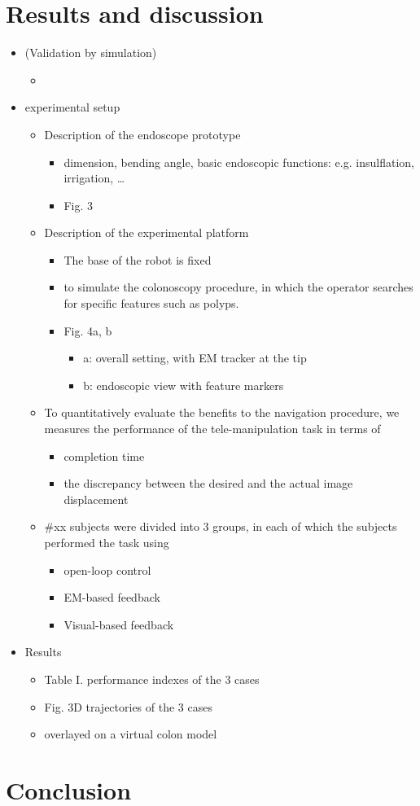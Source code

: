 \documentclass[journal,onecolumn]{IEEEtran}
\begin{document}
\section{Results and discussion}
\label{sec:org17c1b76}
\begin{itemize}
\item (Validation by simulation)
\begin{itemize}
\item 
\end{itemize}
\item experimental setup
\begin{itemize}
\item Description of the endoscope prototype
\begin{itemize}
\item dimension, bending angle, basic endoscopic functions: e.g. insulflation, irrigation, \ldots{}
\item Fig. 3
\end{itemize}
\item Description of the experimental platform
\begin{itemize}
\item The base of the robot is fixed
\item to simulate the colonoscopy procedure, in which the operator searches for specific features such as polyps.
\item Fig. 4a, b
\begin{itemize}
\item a: overall setting, with EM tracker at the tip
\item b: endoscopic view with feature markers
\end{itemize}
\end{itemize}
\item To quantitatively evaluate the benefits to the navigation procedure, we measures the performance of the tele-manipulation task in terms of
\begin{itemize}
\item completion time
\item the discrepancy between the desired and the actual image displacement
\end{itemize}
\item \#xx subjects were divided into 3 groups, in each of which the subjects performed the task using
\begin{itemize}
\item open-loop control
\item EM-based feedback
\item Visual-based feedback
\end{itemize}
\end{itemize}
\item Results
\begin{itemize}
\item Table I. performance indexes of the 3 cases
\item Fig. 3D trajectories of the 3 cases
\item overlayed on a virtual colon model
\end{itemize}
\end{itemize}

\section{Conclusion}
\label{sec:orge099be8}




\clearpage
\end{document}
